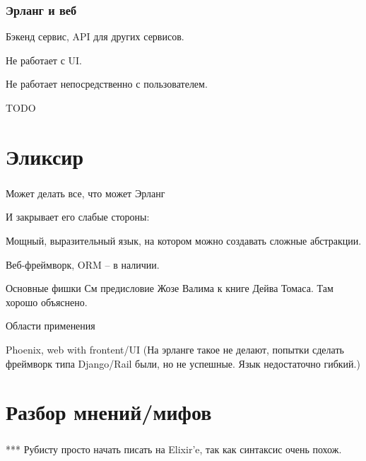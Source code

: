 \documentclass[10pt]{beamer}
\begin{document}
\begin{frame}
\frametitle{Эрланг и веб}
\centering
Бэкенд сервис, API для других сервисов.
\par \bigskip
Не работает с UI.
\par \bigskip
Не работает непосредственно с пользователем.
\end{frame}


\iffalse TODO


\section{Эликсир}

\begin{frame}
\frametitle{}
\centering
\par \bigskip
\end{frame}

\begin{frame}
\frametitle{}
\centering
\par \bigskip
\end{frame}

Может делать все, что может Эрланг

И закрывает его слабые стороны:

Мощный, выразительный язык, на котором можно создавать сложные абстракции.

Веб-фреймворк, ORM -- в наличии.

Основные фишки
См предисловие Жозе Валима к книге Дейва Томаса. Там хорошо объяснено.

Области применения

Phoenix, web with frontent/UI
(На эрланге такое не делают, попытки сделать фреймворк типа Django/Rail были, но не успешные. Язык недостаточно гибкий.)


\section{Разбор мнений/мифов}

\begin{frame}
\frametitle{}
\centering
\par \bigskip
\end{frame}

\begin{frame}
\frametitle{}
\centering
\par \bigskip
\end{frame}

*** Рубисту просто начать писать на Elixir'e, так как синтаксис очень похож.
\end{document}
